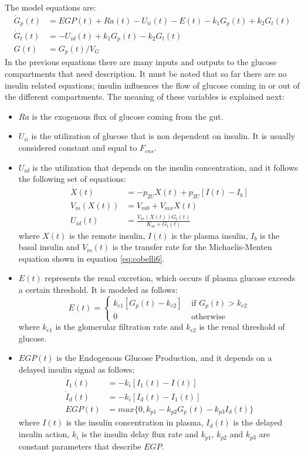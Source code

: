 The model equations are:
\begin{align}
  \dot{G}_{p}(t) &= EGP(t) + Ra(t) - U_{ii}(t) - E(t) - k_{1}G_{p}(t) + k_{2}G_{t}(t) \label{eq:cobelli1} \\
  \dot{G}_{t}(t) &= -U_{id}(t) + k_{1}G_{p}(t) - k_{2}G_{t}(t) \label{eq:cobelli2} \\
  G(t) &=G_{p}(t)/V_{G} \label{eq:cobelli3}
\end{align}
In the previous equations there are many inputs and outputs to the glucose compartments that need description. It must be noted that so far there are no insulin related equations; insulin influences the flow of glucose coming in or out of the different compartments. The meaning of these variables is explained next:
\begin{itemize}
	\item $Ra$ is the exogenous flux of glucose coming from the gut.
	\item $U_{ii}$ is the utilization of glucose that is non dependent on insulin. It is usually considered constant and equal to $F_{cns}$. 
	\item $U_{id}$ is the utilization that depends on the insulin concentration, and it follows the following set of equations:
  \begin{align}
  	\dot{X}(t) &= -p_{2U}X(t)+p_{2U}[I(t)-I_{b}]\label{eq:cobelli4} \\
  	V_{m}(X(t)) &= V_{m0}+V_{mx}X(t) \label{eq:cobelli5} \\
		U_{id}(t) &= \frac{V_{m}(X(t))G_{t}(t)}{K_{m}+G_{t}(t)} \label{eq:cobelli6}
	\end{align}	
	where $X(t)$ is the remote insulin, $I(t)$ is the plasma insulin, $I_{b}$ is the basal insulin and $V_{m}(t)$ is the transfer rate for the Michaelis-Menten equation shown in equation \eqref{eq:cobelli6}.
  \item $E(t)$ represents the renal excretion, which occurs if plasma glucose exceeds a certain threshold. It is modeled as follows:
  \begin{equation}
	E(t) = \left\{
		\begin{array}{cc} k_{e1}[G_{p}(t)-k_{e2}] & \mbox{ if } G_{p}(t)>k_{e2} \\
		0 &\mbox{ otherwise } 
		\end{array} \right.
  \label{eq:cobelli7}
  \end{equation}
  where $k_{e1}$ is the glomerular filtration rate and $k_{e2}$ is the renal threshold of glucose.
  \item $EGP(t)$ is the Endogenous Glucose Production, and it depends on a delayed insulin signal as follows:
  \begin{align}
  	\dot{I}_{1}(t) &= -k_{i}[I_{1}(t)-I(t)] \label{eq:cobelli8} \\
  	\dot{I}_{d}(t) &= -k_{i}[I_{d}(t)-I_{1}(t)] \label{eq:cobelli9} \\
		EGP(t) &= max\{0,k_{p1}-k_{p2}G_{p}(t)-k_{p3}I_{d}(t)\} \label{eq:cobelli10}
	\end{align}
	where $I(t)$ is the insulin concentration in plasma, $I_d(t)$ is the delayed insulin action, $k_i$ is the insulin delay flux rate and $k_{p1}$, $k_{p2}$ and $k_{p3}$ are constant parameters that describe $EGP$.
\end{itemize}
